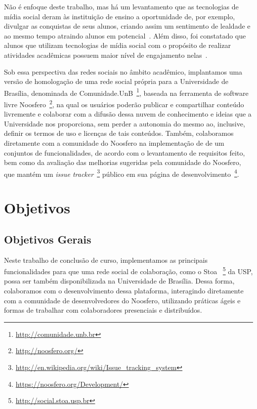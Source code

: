  
 
Não é enfoque deste trabalho, mas há um levantamento que as tecnologias de mídia social deram às
instituição de ensino a oportunidade de, por exemplo, divulgar as conquistas de seus alunos,
criando assim um sentimento de lealdade e ao mesmo tempo atraindo alunos em
potencial~\cite{solis2008}. 
%
Além disso, foi constatado que alunos que utilizam tecnologias de mídia social
com o propósito de realizar atividades acadêmicas possuem maior nível de
engajamento nelas~. 
 
 
Sob essa perspectiva das redes sociais no âmbito acadêmico, implantamos uma versão de homologação
de uma rede social própria para a Universidade de
Brasília, denominada de Comunidade.UnB~\footnote{\url{http://comunidade.unb.br}}, baseada na ferramenta de software livre 
Noosfero~\footnote{\url{http://noosfero.org/}},
na qual os usuários poderão publicar e compartilhar conteúdo livremente e
colaborar com a difusão dessa nuvem de conhecimento e ideias que a Universidade
nos proporciona, sem perder a autonomia do mesmo ao, inclusive, definir os termos
de uso e licenças de tais conteúdos.
%
Também, colaboramos diretamente com a comunidade do Noosfero na implementação de
de um conjuntos de funcionalidades, de acordo com o levantamento de requisitos feito,
bem como da avaliação das melhorias sugeridas pela comunidade do Noosfero, que mantém
um \textit{issue tracker}~\footnote{\url{http://en.wikipedia.org/wiki/Issue_tracking_system}}
público em sua página de desenvolvimento~\footnote{\url{https://noosfero.org/Development/}}.
 
 
\section{Objetivos}
 
\subsection{Objetivos Gerais}
 
Neste trabalho de conclusão de curso, implementamos as
principais funcionalidades para que uma rede social de colaboração, como o Stoa
~\footnote{\url{http://social.stoa.usp.br}} da USP, 
possa ser também disponibilizada na Universidade de Brasília. 
%
Dessa forma, colaboramos com o desenvolvimento dessa plataforma, interagindo diretamente com
a  comunidade de desenvolvedores do Noosfero, utilizando práticas ágeis e formas de trabalhar
com colaboradores presenciais e distribuídos.
 
